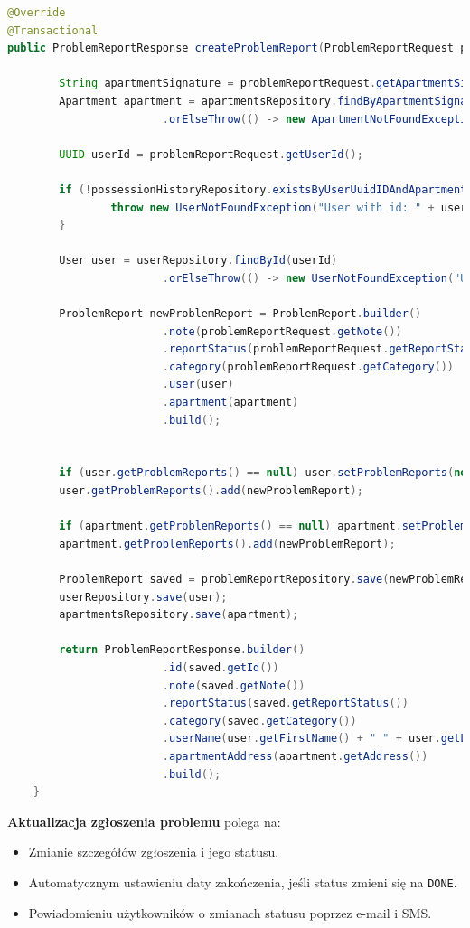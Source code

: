 \begin{lstlisting}[language=Java, style=JavaStyle, caption=Tworzenie zgłoszenia problemu., label=lst:zgloszenie]
@Override
@Transactional
public ProblemReportResponse createProblemReport(ProblemReportRequest problemReportRequest) throws UserNotFoundException, ApartmentNotFoundException {

		String apartmentSignature = problemReportRequest.getApartmentSignature();
		Apartment apartment = apartmentsRepository.findByApartmentSignature(apartmentSignature)
						.orElseThrow(() -> new ApartmentNotFoundException("Apartment not found with id: " + apartmentSignature));

		UUID userId = problemReportRequest.getUserId();

		if (!possessionHistoryRepository.existsByUserUuidIDAndApartmentUuidID(userId, apartment.getUuidID())) {
				throw new UserNotFoundException("User with id: " + userId + " does not have access to apartment with signature: " + apartmentSignature);
		}

		User user = userRepository.findById(userId)
						.orElseThrow(() -> new UserNotFoundException("User not found with id: " + userId));

		ProblemReport newProblemReport = ProblemReport.builder()
						.note(problemReportRequest.getNote())
						.reportStatus(problemReportRequest.getReportStatus())
						.category(problemReportRequest.getCategory())
						.user(user)
						.apartment(apartment)
						.build();


		if (user.getProblemReports() == null) user.setProblemReports(new ArrayList<>());
		user.getProblemReports().add(newProblemReport);

		if (apartment.getProblemReports() == null) apartment.setProblemReports(new ArrayList<>());
		apartment.getProblemReports().add(newProblemReport);

		ProblemReport saved = problemReportRepository.save(newProblemReport);
		userRepository.save(user);
		apartmentsRepository.save(apartment);

		return ProblemReportResponse.builder()
						.id(saved.getId())
						.note(saved.getNote())
						.reportStatus(saved.getReportStatus())
						.category(saved.getCategory())
						.userName(user.getFirstName() + " " + user.getLastName())
						.apartmentAddress(apartment.getAddress())
						.build();
    }
\end{lstlisting}


\noindent \textbf{Aktualizacja zgłoszenia problemu} polega na:
\begin{itemize}
    \item Zmianie szczegółów zgłoszenia i jego statusu.
    \item Automatycznym ustawieniu daty zakończenia, jeśli status zmieni się na \texttt{DONE}.
    \item Powiadomieniu użytkowników o zmianach statusu poprzez e-mail i SMS.
\end{itemize}

